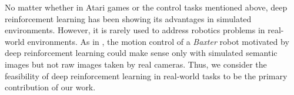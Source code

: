 No matter whether in Atari games or the control tasks mentioned above, deep reinforcement learning has been showing its advantages in simulated environments. However, it is rarely used to address robotics problems in real-world environments. As in \cite{zhang2015towards}, the motion control of a \textit{Baxter} robot motivated by deep reinforcement learning could make sense only with simulated semantic images but not raw images taken by real cameras. Thus, we consider the feasibility of deep reinforcement learning in real-world tasks to be the primary contribution of our work.
